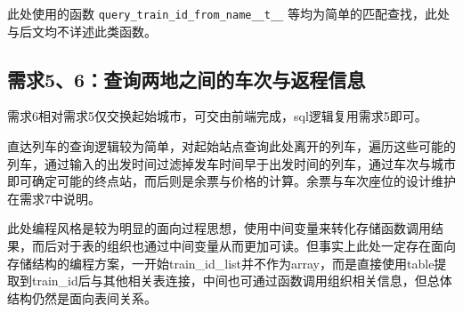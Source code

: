 \documentclass[UTF-8,twoside,c5size,hyperref]{ctexart}
\begin{document}
    此处使用的函数 \texttt{query_train_id_from_name__t__} 等均为简单的匹配查找，此处与后文均不详述此类函数。
    
    \subsection{需求\textbf{5、6}：查询两地之间的车次与返程信息}
    
    需求6相对需求5仅交换起始城市，可交由前端完成，sql逻辑复用需求5即可。
    
    直达列车的查询逻辑较为简单，对起始站点查询此处离开的列车，遍历这些可能的列车，通过输入的出发时间过滤掉发车时间早于出发时间的列车，通过车次与城市即可确定可能的终点站，而后则是余票与价格的计算。余票与车次座位的设计维护在需求7中说明。
    
    此处编程风格是较为明显的面向过程思想，使用中间变量来转化存储函数调用结果，而后对于表的组织也通过中间变量从而更加可读。但事实上此处一定存在面向存储结构的编程方案，一开始train\_id\_list并不作为array，而是直接使用table提取到train\_id后与其他相关表连接，中间也可通过函数调用组织相关信息，但总体结构仍然是面向表间关系。
    
\end{document}
